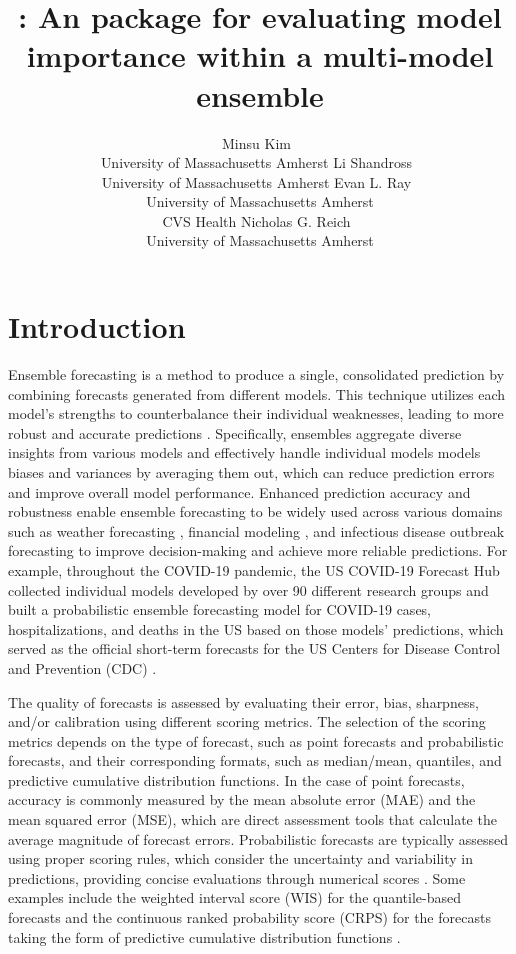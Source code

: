 \documentclass[
  article,
  shortnames,
  notitle]{jss}
\author{Minsu Kim~\orcidlink{0009-0008-4637-3589}\\University of
Massachusetts Amherst \And Li
Shandross~\orcidlink{0009-0008-1348-1954}\\University of Massachusetts
Amherst \AND Evan L. Ray~\orcidlink{0000-0003-4035-0243}\\University of
Massachusetts Amherst \\ CVS Health \And Nicholas G.
Reich~\orcidlink{0000-0003-3503-9899}\\University of Massachusetts
Amherst}
\title{\pkg{modelimportance}: An \proglang{R} package for evaluating
model importance within a multi-model ensemble}
\begin{document}
\maketitle


\section{Introduction}\label{sec:intro}

Ensemble forecasting is a method to produce a single, consolidated
prediction by combining forecasts generated from different models. This
technique utilizes each model's strengths to counterbalance their
individual weaknesses, leading to more robust and accurate predictions
\citep{gneiting2005weather, hastie01statisticallearning, lutz_applying_2019, viboud_rapidd_2018}.
Specifically, ensembles aggregate diverse insights from various models
and effectively handle individual models models biases and variances by
averaging them out, which can reduce prediction errors and improve
overall model performance. Enhanced prediction accuracy and robustness
enable ensemble forecasting to be widely used across various domains
such as weather forecasting \citep{Guerra_2020, gneiting2005weather},
financial modeling \citep{SUN2020101160, math11041054}, and infectious
disease outbreak forecasting
\citep{ray_prediction_2018, reich_accuracy_2019} to improve
decision-making and achieve more reliable predictions. For example,
throughout the COVID-19 pandemic, the US COVID-19 Forecast Hub collected
individual models developed by over 90 different research groups and
built a probabilistic ensemble forecasting model for COVID-19 cases,
hospitalizations, and deaths in the US based on those models'
predictions, which served as the official short-term forecasts for the
US Centers for Disease Control and Prevention (CDC)
\citep{cramer2022united}.

The quality of forecasts is assessed by evaluating their error, bias,
sharpness, and/or calibration using different scoring metrics. The
selection of the scoring metrics depends on the type of forecast, such
as point forecasts and probabilistic forecasts, and their corresponding
formats, such as median/mean, quantiles, and predictive cumulative
distribution functions. In the case of point forecasts, accuracy is
commonly measured by the mean absolute error (MAE) and the mean squared
error (MSE), which are direct assessment tools that calculate the
average magnitude of forecast errors. Probabilistic forecasts are
typically assessed using proper scoring rules, which consider the
uncertainty and variability in predictions, providing concise
evaluations through numerical scores \citep{gneiting_strictly_2007}.
Some examples include the weighted interval score (WIS) for the
quantile-based forecasts and the continuous ranked probability score
(CRPS) for the forecasts taking the form of predictive cumulative
distribution functions \citep{bracher_evaluating_2021}.
\end{document}
